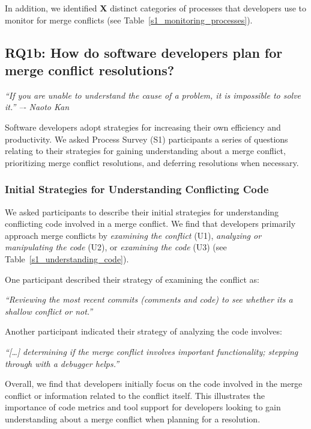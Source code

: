In addition, we identified \textbf{X} distinct categories of processes that developers use to monitor for merge conflicts (see Table~\ref{s1_monitoring_processes}).
 
\subsection{\textbf{RQ1b:} How do software developers plan for merge conflict resolutions?}\label{RQ1b}
\vspace*{-0.5\baselineskip}
\begin{quoting}
\textit{``If you are unable to understand the cause of a problem, it is impossible to solve it.'' –- Naoto Kan}
\end{quoting}
\vspace*{+0.3\baselineskip}

Software developers adopt strategies for increasing their own efficiency and productivity.
We asked Process Survey (S1) participants a series of questions relating to their strategies for gaining understanding about a merge conflict, prioritizing merge conflict resolutions, and deferring resolutions when necessary.

\subsubsection{Initial Strategies for Understanding Conflicting Code}

We asked participants to describe their initial strategies for understanding conflicting code involved in a merge conflict.
We find that developers primarily approach merge conflicts by \textit{examining the conflict} (U1), \textit{analyzing or manipulating the code} (U2), or \textit{examining the code} (U3) (see Table~\ref{s1_understanding_code}).

One participant described their strategy of examining the conflict as:
\begin{quoting}
\textit{``Reviewing the most recent commits (comments and code) to see whether its a shallow conflict or not.''}
\end{quoting}
Another participant indicated their strategy of analyzing the code involves:
\begin{quoting}
\textit{``[\ldots] determining if the merge conflict involves important functionality; stepping through with a debugger helps.''}
\end{quoting}
Overall, we find that developers initially focus on the code involved in the merge conflict or information related to the conflict itself.
This illustrates the importance of code metrics and tool support for developers looking to gain understanding about a merge conflict when planning for a resolution.

